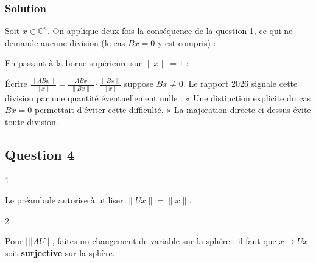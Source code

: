 \documentclass[11pt,a4paper]{article}
\newcommand{\equationajustee}[1]{%
  \sbox{\boiteequation}{$\displaystyle #1$}%
  \ifdim\wd\boiteequation>\linewidth
    \[\resizebox{\linewidth}{!}{\usebox{\boiteequation}}\]%
  \else
    \[#1\]%
  \fi}
\begin{document}
\hypertarget{solution-2}{%
\subsubsection{Solution}\label{solution-2}}

Soit \(x\in\mathbb C^n\). On applique deux fois la conséquence de la question 1, ce qui ne demande aucune division (le cas \(Bx=0\) y est compris) :

\equationajustee{\begin{aligned}\|ABx\|&\le\vert\!\vert\!\vert A\vert\!\vert\!\vert \,\|Bx\|\\ &\le\vert\!\vert\!\vert A\vert\!\vert\!\vert \,\vert\!\vert\!\vert B\vert\!\vert\!\vert \,\|x\|.\end{aligned}}

En passant à la borne supérieure sur \(\|x\|=1\) :

\equationajustee{\boxed{\vert\!\vert\!\vert AB\vert\!\vert\!\vert \le\vert\!\vert\!\vert A\vert\!\vert\!\vert \cdot\vert\!\vert\!\vert B\vert\!\vert\!\vert }}

\begin{piege}

Écrire \(\frac{\|ABx\|}{\|x\|}=\frac{\|ABx\|}{\|Bx\|}\cdot\frac{\|Bx\|}{\|x\|}\) suppose \(Bx\neq0\). Le rapport 2026 signale cette division par une quantité éventuellement nulle : « Une distinction explicite du cas \(Bx = 0\) permettait d'éviter cette difficulté. » La majoration directe ci-dessus évite toute division.

\end{piege}

\hypertarget{question-4}{%
\subsection{Question 4}\label{question-4}}

\begin{indication}{1}

Le préambule autorise à utiliser \(\|Ux\|=\|x\|\).

\end{indication}

\begin{indication}{2}

Pour \(\vert\!\vert\!\vert AU\vert\!\vert\!\vert\), faites un changement de variable sur la sphère : il faut que \(x\mapsto Ux\) soit \textbf{surjective} sur la sphère.

\end{indication}
\end{document}
